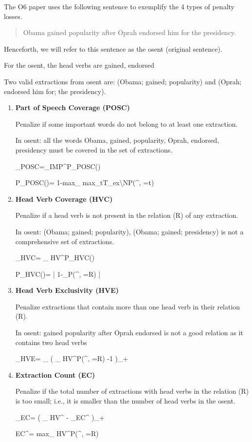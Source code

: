 The O6 paper uses the following sentence
to exemplify the 4 types
of penalty losses. 

\begin{quote}\color{red}
Obama gained popularity after
Oprah endorsed him for the presidency.
\end{quote}
Henceforth, we will refer to
this sentence as the osent (original sentence).

For the osent, the head verbs are {\color{red} gained, endorsed}

Two valid extractions from osent are:
{\color{red}(Obama; gained; popularity)}
and {\color{red}(Oprah; endorsed him for;
 the presidency)}.


\begin{enumerate}

\item {\bf Part of Speech Coverage (POSC)}

Penalize if 
some important words do not belong to at least one extraction.

In osent: all the words {\color{red}Obama, gained, popularity,
Oprah, endorsed, presidency} must be covered in
the set of extractions.

\beq
\call_{POSC}=\sum_{\alp\in [\ell]}IMP^{\alp}P_{POSC}(\alp)
\eeq

\beq
P_{POSC}(\alp)=
1-{\rm max}_{\mu\in [M]}
{\rm max}_{t\in T_{ex}\backslash N}P(\rvt^{\mu, \alp}=t)
\eeq

\item {\bf Head Verb Coverage (HVC)}

Penalize if a head verb
is not present in the relation (R) of any extraction.

In osent: {\color{red} (Obama;
gained; popularity), (Obama; gained; presidency)} is not a comprehensive set of extractions.

\beq
\call_{HVC}=
\sum_{\alp\in [\ell]}
HV^\alp P_{HVC}(\alp)
\eeq

\beq
P_{HVC}(\alp)=
\left|
1-\sum_{\mu\in [M]}P(\rvt^{\mu, \alp}=R)
\right|
\eeq

\item {\bf Head Verb Exclusivity (HVE)}

Penalize extractions that 
contain more than one head verb in their relation (R).

In osent: {\color{red}gained popularity after Oprah endorsed} is not a good relation as it contains two
head verbs

\beq
\call_{HVE}=
\sum_{\mu\in [M]}
\left(
\sum_{\alp\in [\ell]}
HV^\alp P(\rvt^{\mu, \alp}=R)
-1
\right)_+
\eeq

\item {\bf Extraction Count (EC)}

Penalize if the total number of extractions with head verbs in the relation (R) 
is too small; i.e., it is smaller
 than the number of head verbs
in the osent.

\beq
\call_{EC}=
\left(
\sum_{\alp\in[\ell]} HV^\alp
-
\sum_{\mu\in [M]}EC^\mu
\right)_+
\eeq

\beq
EC^\mu=
{\rm max}_{\alp\in [\ell]}
HV^\alp P(\rvt^{\mu, \alp}=R)
\eeq


\end{enumerate}

